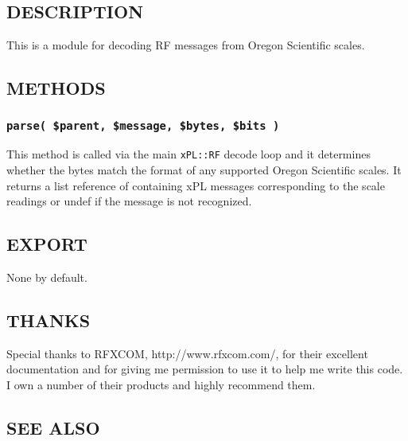 \documentclass[12pt,a4paper]{article}
\begin{document}
\subsection*{DESCRIPTION\label{xPL::RF::OregonScale_DESCRIPTION}}


This is a module for decoding RF messages from Oregon Scientific scales.

\subsection*{METHODS\label{xPL::RF::OregonScale_METHODS}}
\subsubsection*{\texttt{parse( \$parent, \$message, \$bytes, \$bits )}\label{xPL::RF::OregonScale_parse_parent_message_bytes_bits_}}


This method is called via the main \texttt{xPL::RF} decode loop and it
determines whether the bytes match the format of any supported Oregon
Scientific scales.  It returns a list reference of containing xPL
messages corresponding to the scale readings or undef if the message
is not recognized.

\subsection*{EXPORT\label{xPL::RF::OregonScale_EXPORT}}


None by default.

\subsection*{THANKS\label{xPL::RF::OregonScale_THANKS}}


Special thanks to RFXCOM, \textsf{http://www.rfxcom.com/}, for their
excellent documentation and for giving me permission to use it to help
me write this code.  I own a number of their products and highly
recommend them.

\subsection*{SEE ALSO\label{xPL::RF::OregonScale_SEE_ALSO}}
\end{document}
